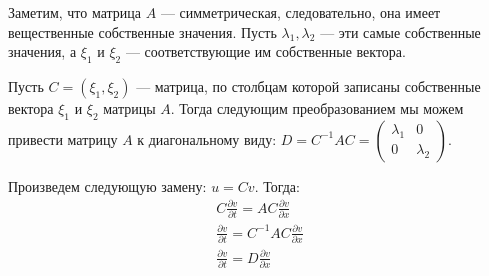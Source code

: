\documentclass[titlepage]{article}
\def\l{\left}
\def\r{\right}
\def\part{\partial}
\begin{document}
Заметим, что матрица $A$ --- симметрическая, следовательно, она имеет вещественные собственные значения. Пусть $\lambda_1, \lambda_2$ --- эти самые собственные значения, а $\xi_1$ и $\xi_2$ --- соответствующие им собственные вектора.

Пусть $C = \l(\xi_1, \xi_2\r)$ --- матрица, по столбцам которой записаны собственные вектора $\xi_1$ и $\xi_2$ матрицы $A$. Тогда следующим преобразованием мы можем привести матрицу $A$ к диагональному виду: $D = C^{-1}AC = \l(\begin{matrix} \lambda_1 & 0 \\ 0 & \lambda_2 \end{matrix}\r)$.

Произведем следующую замену: $u = Cv$. Тогда:
\begin{gather*}
	C\frac{\part v}{\part t} = AC\frac{\part v}{\part x} 
	\\
	\frac{\part v}{\part t} = C^{-1}AC\frac{\part v}{\part x}
	\\
	\frac{\part v}{\part t} = D\frac{\part v}{\part x}	
\end{gather*}
\end{document}
